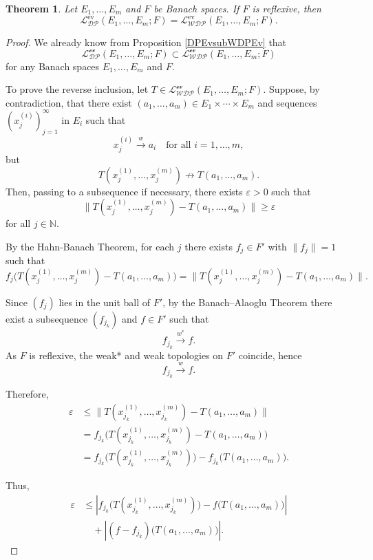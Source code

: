 \documentclass[12 pt]{article}%
\newtheorem{theorem}{Theorem}[section]
\newtheorem{final remark}[theorem]{Final Remark}
\begin{document}

\begin{theorem}\label{WDP=WDP}
	Let $E_1,\dots,E_m$ and $F$ be Banach spaces. If $F$ is reflexive, then
	\[
	\mathcal{L_{DP}^{\mathrm{ev}}}(E_1,\dots,E_m;F)
	=
	\mathcal{L_{WDP}^{\mathrm{ev}}}(E_1,\dots,E_m;F).
	\]
\end{theorem}

\begin{proof}
	We already know from Proposition \ref{DPEvsubWDPEv} that
	\[
	\mathcal{L_{DP}^{\text{ev}}}(E_1,\dots, E_m; F) \subset \mathcal{L_{WDP}^{\text{ev}}}(E_1,\dots, E_m; F)
	\]
	for any Banach spaces $E_1,\dots, E_m$ and $F$.
	
	To prove the reverse inclusion, let $T \in \mathcal{L_{WDP}^{\text{ev}}}(E_1,\dots, E_m; F)$. Suppose, by contradiction, that there exist $(a_1,\dots, a_m) \in E_1 \times \cdots \times E_m$ and sequences $(x_j^{(i)})_{j=1}^\infty$ in $E_i$ such that
	\[
	x_j^{(i)} \overset{w}{\longrightarrow} a_i \quad \text{for all } i=1,\dots,m,
	\]
	but
	\[
	T(x_j^{(1)},\dots, x_j^{(m)}) \nrightarrow T(a_1,\dots, a_m).
	\]
	Then, passing to a subsequence if necessary, there exists $\varepsilon > 0$ such that
	\[
	\|T(x_j^{(1)},\dots, x_j^{(m)}) - T(a_1,\dots, a_m)\| \ge \varepsilon
	\]
	for all $j \in \mathbb{N}$.
	
	By the Hahn-Banach Theorem, for each $j$ there exists $f_j \in F'$ with $\|f_j\| = 1$ such that
	\[
	f_j\big(T(x_j^{(1)},\dots, x_j^{(m)}) - T(a_1,\dots, a_m)\big)
	= \|T(x_j^{(1)},\dots, x_j^{(m)}) - T(a_1,\dots, a_m)\|.
	\]
	
	Since $(f_j)$ lies in the unit ball of $F'$, by the Banach--Alaoglu Theorem there exist a subsequence $(f_{j_k})$ and $f \in F'$ such that
	\[
	f_{j_k} \overset{w^*}{\longrightarrow} f.
	\]
	As $F$ is reflexive, the weak* and weak topologies on $F'$ coincide, hence
	\[
	f_{j_k} \overset{w}{\longrightarrow} f.
	\]
	
	Therefore,
	\begin{align*}
		\varepsilon 
		&\le \|T(x_{j_k}^{(1)},\dots, x_{j_k}^{(m)}) - T(a_1,\dots, a_m)\| \\
		&= f_{j_k}\big(T(x_{j_k}^{(1)},\dots, x_{j_k}^{(m)}) - T(a_1,\dots, a_m)\big) \\
		&= f_{j_k}\big(T(x_{j_k}^{(1)},\dots, x_{j_k}^{(m)})\big) - f_{j_k}\big(T(a_1,\dots, a_m)\big).
	\end{align*}
	
	Thus,
	\begin{align*}
		\varepsilon 
		&\le \left| f_{j_k}\big(T(x_{j_k}^{(1)},\dots, x_{j_k}^{(m)})\big) - f\big(T(a_1,\dots, a_m)\big) \right| \\
		&\quad + \left| (f - f_{j_k})\big(T(a_1,\dots, a_m)\big) \right|.
	\end{align*}
	

\end{proof}
\end{document}
